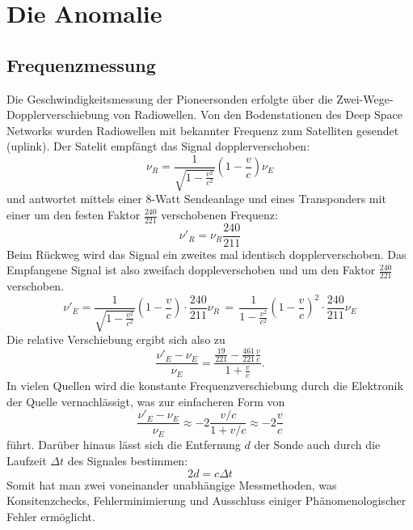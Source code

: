 \documentclass[a4paper,10pt]{article}
\begin{document}
\section{Die Anomalie}
\subsection{Frequenzmessung}

Die Geschwindigkeitsmessung der Pioneersonden erfolgte über die Zwei-Wege-Dopplerverschiebung von Radiowellen.
Von den Bodenstationen des Deep Space Networks wurden Radiowellen mit bekannter Frequenz zum Satelliten gesendet (uplink).
Der Satelit empfängt das Signal dopplerverschoben:
\begin{equation}
 \nu_R = \frac{1}{\sqrt{1-\frac{v^2}{c^2}}}(1-\frac{v}{c})\nu_E
\end{equation}
und antwortet mittels einer 8-Watt Sendeanlage und eines Transponders
mit einer um den festen Faktor $ \frac{240}{221} $ verschobenen Frequenz:
\begin{equation}
\nu'_R = \nu_R\frac{240}{211}
\end{equation}
Beim Rückweg wird das Signal ein zweites mal identisch dopplerverschoben.
Das Empfangene Signal ist also zweifach doppleverschoben und um den Faktor $\frac{240}{221}$ verschoben.
\begin{equation}
 \nu'_E = \frac{1}{\sqrt{1-\frac{v^2}{c^2}}}(1-\frac{v}{c}) \cdot \frac{240}{211}\nu_R \, = \, \frac{1}{1-\frac{v^2}{c^2}}(1-\frac{v}{c})^2 \cdot \frac{240}{211} \nu_E
\end{equation}
Die relative Verschiebung ergibt sich also zu
\begin{equation}
 \frac{\nu'_E-\nu_E}{\nu_E} = \frac{\frac{19}{221}- \frac{461}{221}\frac{v}{c}}{1+\frac{v}{c}}.
\end{equation}
In vielen Quellen wird die konstante Frequenzverschiebung durch die Elektronik der Quelle vernachlässigt, was zur einfacheren Form von
\begin{equation}
 \frac{\nu'_E-\nu_E}{\nu_E} \approx -2\frac{v/c}{1+v/c} \approx -2 \frac{v}{c}
\end{equation}
führt.
Darüber hinaus lässt sich die Entfernung $d$ der Sonde auch durch die Laufzeit $\Delta t$ des Signales bestimmen:
\begin{equation}
 2d = c \Delta t
\end{equation}
Somit hat man zwei voneinander unabhängige Messmethoden, was Konsitenzchecks,
Fehlerminimierung und Ausschluss einiger Phänomenologischer Fehler ermöglicht.
\end{document}

